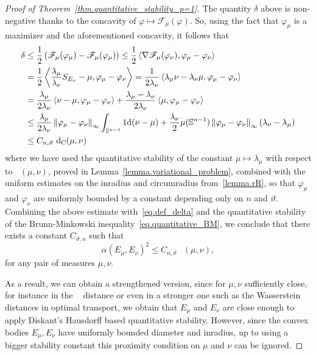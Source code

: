 \documentclass[a4paper, 10pt, twoside]{amsart}
\numberwithin{equation}{section}
\theoremstyle{plain}
\theoremstyle{definition}
\DeclareMathOperator{\dc}{\mathrm{d}_\mathrm{C}}
\begin{document}
\begin{proof}[Proof of Theorem~\ref{thm.quantitative_stability_p=1}]
    The quantity $\delta$ above is non-negative thanks to the concavity of $\varphi \mapsto \mathscr{F}_\mu(\varphi)$. So, using the fact that $\varphi_{\mu}$ is a maximizer and the aforementioned concavity, it follows that
    \begin{align*}
        \delta &\le \frac{1}{2}
        \left(
            \mathscr{F}_\mu(\varphi_\mu) 
            - 
            \mathscr{F}_\mu(\varphi_\mu) 
        \right)
        \le 
        \frac{1}{2}
        \inner{\nabla \mathscr{F}_\mu(\varphi_\nu), \varphi_\mu - \varphi_\nu}\\
        &= 
        \frac{1}{2}
        \inner{
            \frac{\lambda_\mu}{\lambda_\nu}S_{E_\nu} - \mu, \varphi_\mu - \varphi_\nu}
        = 
        \frac{1}{2\lambda_\nu}
        \inner{\lambda_\mu \nu - \lambda_\nu \mu, \varphi_\mu - \varphi_\nu}\\ 
        &= 
        \frac{\lambda_\mu}{2\lambda_\nu} \inner{\nu - \mu, \varphi_\mu - \varphi_\nu}
        + 
        \frac{\lambda_\mu - \lambda_\nu}{2\lambda_\nu} \inner{\mu, \varphi_\mu - \varphi_\nu}
        \\
        &\le 
        \frac{\lambda_\mu}{2\lambda_\nu} \norm{\varphi_\mu - \varphi_\nu}_\infty 
        \int_{\mathbb{S}^{n-1}} 1 \dd (\nu - \mu) 
        + 
        \frac{\lambda_\nu}{2}\mu(\mathbb{S}^{n-1})\norm{\varphi_\mu - \varphi_\nu}_\infty (\lambda_\nu - \lambda_\mu) \\ 
        &\le  
        C_{n,\vartheta}\, \dc(\mu,\nu)
    \end{align*}
    where we have used the quantitative stability of the constant $\mu \mapsto \lambda_\mu$ with respect to $\dc(\mu,\nu)$, proved in Lemma~\ref{lemma.variational_problem}, combined with the uniform estimates on the inradius and circumradius from~\ref{lemma.rR}, so that $\varphi_\mu$ and $\varphi_\nu$ are uniformly bounded by a constant depending only on $n$ and $\vartheta$. Combining the above estimate with~\eqref{eq.def_delta} and the quantitative stability of the Brunn-Minkowski inequality~\eqref{eq.quantitative_BM}, we conclude that there exists a constant $C_{\vartheta,n}$ such that 
    \[
        \alpha(E_\mu, E_\nu)^2 \le C_{n,\vartheta}\, {\dc(\mu,\nu)},
    \]
    for any pair of measures $\mu,\nu$. 

    As a result, we can obtain a strengthened version, since for $\mu,\nu$ sufficiently close, for instance in the $\dc$ distance or even in a stronger one such as the Wasserstein distances in optimal transport, we obtain that $E_\mu$ and $E_\nu$ are close enough to apply Diskant's Hausdorff based quantitative stability. However, since the convex bodies $E_\mu,E_\nu$ have uniformly bounded diameter and inradius, up to using a bigger stability constant this proximity condition on $\mu$ and $\nu$ can be ignored.
    

\end{proof}
\end{document}
